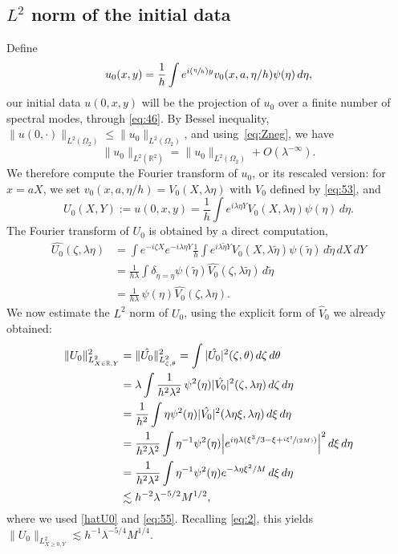 \documentclass[11pt]{article}
\newcommand{\Psfrac}[2]{(\sfrac{#1}{#2})}
\newcommand{\spfrac}[2]{\sfrac{#1}{(#2)}}
\newcommand\R{{\mathbb R}}
\theoremstyle{plain}
\theoremstyle{definition}
\begin{document}
\subsection{$L^2$ norm of the initial data}
Define
\[
u_{0}(x,y)=\frac 1h\int e^{i\Psfrac{\eta}{h}y}v_0(x,a,\eta/h)\psi(\eta)\,d\eta,
\]
our initial data $u(0,x,y)$ will be the projection of $u_{0}$ over a finite number of spectral modes, through \eqref{eq:46}. By Bessel inequality, $\| u(0,\cdot)\|_{L^{2}(\Omega_{2})} \leq \| u_{0}\|_{L^{2}(\Omega_{2})}$, and using~\eqref{eq:Zneg}, we have
\begin{equation}
\label{eq:2}
\|u_{0}\|_{L^{2}(\R^{2})}=\| u_{0}\|_{L^{2}(\Omega_{2})}+O(\lambda^{-\infty}).
\end{equation}
We therefore compute the Fourier transform of $u_{0}$, or its rescaled version: for $x=aX$, we set $v_0(x,a,\eta/h)=V_0(X,\lambda\eta)$ with $V_{0}$ defined by \eqref{eq:53}, and
\[
U_0(X,Y):=u(0,x,y)=\frac 1h \int e^{i\lambda \eta Y}V_0(X,\lambda \eta)\psi(\eta)\,d\eta.
\]
The Fourier transform of $U_0$ is obtained by a direct computation,
\begin{equation}\label{hatU0}\begin{split}
\hat{U_0}(\zeta,\lambda\eta) & =\int e^{-i\zeta X} e^{-i\lambda\eta Y}\frac 1h \int e^{i\lambda \tilde \eta Y}V_0(X,\lambda \tilde \eta)\psi(\tilde\eta)\,d\tilde\eta \,dX \,dY\\
& =\frac{1}{h\lambda}\int \delta_{\tilde\eta=\eta}\psi(\tilde\eta)\hat{V_0}(\zeta,\lambda\tilde\eta)\,d\tilde\eta\\
& =\frac{1}{h\lambda}\,\psi(\eta)\hat{V_0}(\zeta,\lambda\eta).
\end{split}\end{equation}
We now estimate the $L^2$ norm of $U_0$, using the explicit form of $\hat V_{0}$ we already obtained:%
\begin{equation}
\label{eq:56}
\begin{split}
\|U_{0}\|^2_{L^{2}_{X\in\mathbb{R},Y}} & = \|\hat{U_{0}}\|^2_{L^{2}_{\zeta,\theta}}=\int |\hat{U_0}|^2(\zeta,\theta)\,d\zeta \,d\theta\\
& =\lambda \int \frac{1}{h^2\lambda^2}\,\psi^2(\eta)|\hat{V_0}|^2(\zeta,\lambda\eta)\,d\zeta \,d\eta\\
& =\frac{1}{h^2}\int \eta\psi^2(\eta)|\hat{V_0}|^2(\lambda\eta\xi,\lambda\eta)\,d\xi \,d\eta\\
& =\frac{1}{h^2\lambda^2}\int \eta^{-1}\psi^2(\eta)\Big|e^{i\eta\lambda(\xi^{3}/3-\xi+\spfrac{i\xi^{2}}{2M})}\Big|^2\,d\xi \,d\eta\\
& = \frac{1}{h^2\lambda^2}\int \eta^{-1}\psi^2(\eta) e^{-\lambda \eta\xi^2/M} \,d\xi \,d\eta\\
& \lesssim h^{-2}\lambda^{-5/2} M^{1/2},
\end{split}
\end{equation}
where we used \eqref{hatU0} and \eqref{eq:55}. Recalling \eqref{eq:2}, this yields $ \|U_{0}\|_{L^{2}_{X\geq 0,Y}}\lesssim h^{-1}\lambda^{-5/4}M^{1/4}$.
\end{document}

